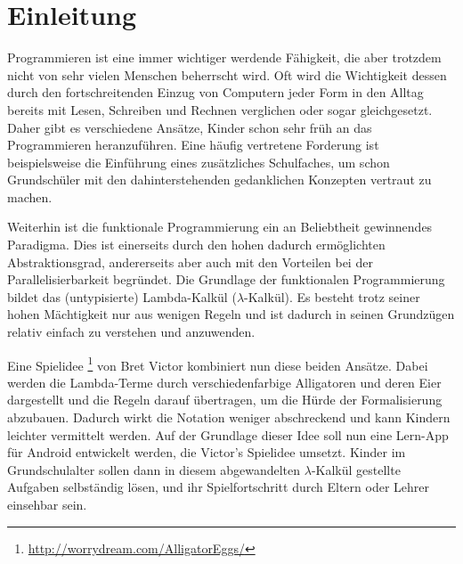 \section{Einleitung}

Programmieren ist eine immer wichtiger werdende Fähigkeit, die aber trotzdem nicht von sehr vielen Menschen beherrscht wird.
Oft wird die Wichtigkeit dessen durch den fortschreitenden Einzug von Computern jeder Form in den Alltag bereits mit Lesen, Schreiben und Rechnen verglichen oder sogar gleichgesetzt.
Daher gibt es verschiedene Ansätze, Kinder schon sehr früh an das Programmieren heranzuführen.
Eine häufig vertretene Forderung ist beispielsweise die Einführung eines zusätzliches Schulfaches, um schon Grundschüler mit den dahinterstehenden gedanklichen Konzepten vertraut zu machen.

Weiterhin ist die funktionale Programmierung ein an Beliebtheit gewinnendes Paradigma.
Dies ist einerseits durch den hohen dadurch ermöglichten Abstraktionsgrad, andererseits aber auch mit den Vorteilen bei der Parallelisierbarkeit begründet.
Die Grundlage der funktionalen Programmierung bildet das (untypisierte) Lambda-Kalkül (\(\lambda\)-Kalkül).
Es besteht trotz seiner hohen Mächtigkeit nur aus wenigen Regeln und ist dadurch in seinen Grundzügen relativ einfach zu verstehen und anzuwenden.

Eine Spielidee \footnote{\url{http://worrydream.com/AlligatorEggs/}} von Bret Victor kombiniert nun diese beiden Ansätze.
Dabei werden die Lambda-Terme durch verschiedenfarbige Alligatoren und deren Eier dargestellt und die Regeln darauf übertragen, um die Hürde der Formalisierung abzubauen.
Dadurch wirkt die Notation weniger abschreckend und kann Kindern leichter vermittelt werden.
Auf der Grundlage dieser Idee soll nun eine Lern-App für Android entwickelt werden, die Victor's Spielidee umsetzt.
Kinder im Grundschulalter sollen dann in diesem abgewandelten \(\lambda\)-Kalkül gestellte Aufgaben selbständig lösen, und ihr Spielfortschritt durch Eltern oder Lehrer einsehbar sein.
